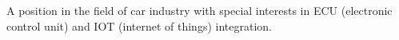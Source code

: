 
         A position in the field of car industry with special 
                interests in ECU (electronic control unit) and IOT (internet of things) integration.

